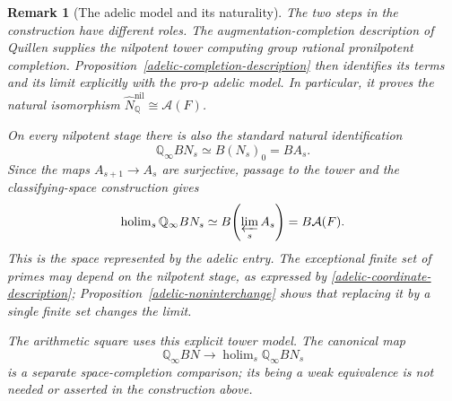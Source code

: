 \documentclass[11pt,a4paper]{article}
\newtheorem{remark}[theorem]{Remark}
\begin{document}
\begin{remark}[The adelic model and its naturality]
The two steps in the construction have different roles.  The
augmentation-completion description of Quillen supplies the
nilpotent tower computing group rational pronilpotent completion.
Proposition~\ref{adelic-completion-description} then identifies its
terms and its limit explicitly with the pro-$p$ adelic model.
In particular, it proves the natural isomorphism
$\widehat N_{\mathbb Q}^{\mathrm{nil}}\cong\mathcal A(F)$.

On every nilpotent stage there is also the standard natural
identification
\[
 \mathbb Q_\infty BN_s\simeq B(N_s)_0=BA_s.
\]
Since the maps $A_{s+1}\to A_s$ are surjective, passage to the tower
and the classifying-space construction gives
\[
 \operatorname{holim}_s\mathbb Q_\infty BN_s
 \simeq B\!\left(\varprojlim_sA_s\right)=B\mathcal A(F).
\]
This is the space represented by the adelic entry.  The exceptional
finite set of primes may depend on the nilpotent stage, as expressed
by \eqref{adelic-coordinate-description};
Proposition~\ref{adelic-noninterchange} shows that replacing it by a
single finite set changes the limit.

The arithmetic square uses this explicit tower model.  The canonical map
\[
 \mathbb Q_\infty BN\longrightarrow\operatorname{holim}_s\mathbb Q_\infty BN_s
\]
is a separate space-completion comparison; its being a weak equivalence
is not needed or asserted in the construction above.
\end{remark}
\end{document}
